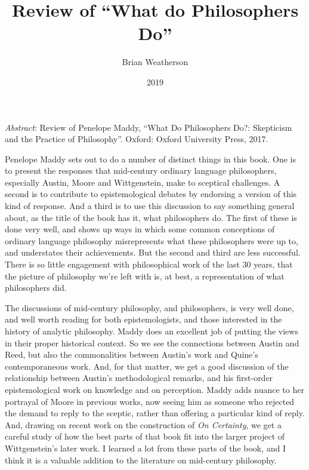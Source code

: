 \documentclass[
  11pt,
  letterpaper,
  DIV=11,
  numbers=noendperiod,
  twoside]{scrartcl}
\title{Review of ``What do Philosophers Do''}
\author{Brian Weatherson}
\date{2019}
\renewenvironment{abstract}
 {\vspace{-1.25cm}
 \quotation\small\noindent\emph{Abstract}:}
 {\endquotation}
\begin{document}
\maketitle
\begin{abstract}
Review of Penelope Maddy, ``What Do Philosophers Do?: Skepticism and the
Practice of Philosophy''. Oxford: Oxford University Press, 2017.
\end{abstract}


Penelope Maddy sets out to do a number of distinct things in this book.
One is to present the responses that mid-century ordinary language
philosophers, especially Austin, Moore and Wittgenstein, make to
sceptical challenges. A second is to contribute to epistemological
debates by endorsing a version of this kind of response. And a third is
to use this discussion to say something general about, as the title of
the book has it, what philosophers do. The first of these is done very
well, and shows up ways in which some common conceptions of ordinary
language philosophy misrepresents what these philosophers were up to,
and understates their achievements. But the second and third are less
successful. There is so little engagement with philosophical work of the
last 30 years, that the picture of philosophy we're left with is, at
best, a representation of what philosophers did.

The discussions of mid-century philosophy, and philosophers, is very
well done, and well worth reading for both epistemologists, and those
interested in the history of analytic philosophy. Maddy does an
excellent job of putting the views in their proper historical context.
So we see the connections between Austin and Reed, but also the
commonalities between Austin's work and Quine's contemporaneous work.
And, for that matter, we get a good discussion of the relationship
between Austin's methodological remarks, and his first-order
epistemological work on knowledge and on perception. Maddy adds nuance
to her portrayal of Moore in previous works, now seeing him as someone
who rejected the demand to reply to the sceptic, rather than offering a
particular kind of reply. And, drawing on recent work on the
construction of \emph{On Certainty}, we get a careful study of how the
best parts of that book fit into the larger project of Wittgenstein's
later work. I learned a lot from these parts of the book, and I think it
is a valuable addition to the literature on mid-century philosophy.
\end{document}
